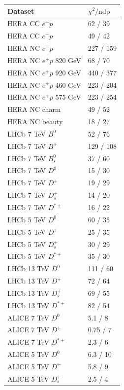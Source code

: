 \documentclass[12pt]{article}
\begin{document}
\begin{table}
\renewcommand*{\arraystretch}{1.12}
    \centering
\begin{tabular}{ll}
    Dataset & $\chi^2/\textrm{ndp}$ \\
    \hline
    HERA CC $e^{+}p$ & 62 / 39  \\ 
    HERA CC $e^{-}p$ & 49 / 42  \\ 
    HERA NC $e^{-}p$ & 227 / 159  \\ 
    HERA NC $e^{+}p$ 820 GeV & 68 / 70  \\ 
    HERA NC $e^{+}p$ 920 GeV & 440 / 377  \\ 
    HERA NC $e^{+}p$ 460 GeV & 223 / 204  \\ 
    HERA NC $e^{+}p$ 575 GeV & 223 / 254  \\ 
    HERA NC charm & 49 / 52  \\ 
    HERA NC beauty & 18 / 27  \\ 
    LHCb 7 TeV $B^0$ & 52 / 76  \\ 
    LHCb 7 TeV $B^{+}$ & 129 / 108  \\ 
    LHCb 7 TeV $B^{0}_s$ & 37 / 60  \\ 
    LHCb 7 TeV $D^0$ & 15 / 30  \\ 
    LHCb 7 TeV $D^{+}$ & 19 / 29  \\ 
    LHCb 7 TeV $D^{+}_{s}$ & 14 / 20  \\ 
    LHCb 7 TeV $D^{*+}$ & 16 / 22  \\ 
    LHCb 5 TeV $D^0$ & 60 / 35  \\ 
    LHCb 5 TeV $D^{+}$ & 25 / 35  \\ 
    LHCb 5 TeV $D^{+}_{s}$ & 30 / 29  \\ 
    LHCb 5 TeV $D^{*+}$ & 35 / 30  \\ 
    LHCb 13 TeV $D^0$ & 111 / 60  \\ 
    LHCb 13 TeV $D^{+}$ & 72 / 64  \\ 
    LHCb 13 TeV $D^{+}_{s}$ & 69 / 55  \\ 
    LHCb 13 TeV $D^{*+}$ & 82 / 54  \\ 
    ALICE 7 TeV $D^0$ & 5.1 / 8  \\ 
    ALICE 7 TeV $D^{+}$ & 0.75 / 7  \\ 
    ALICE 7 TeV $D^{*+}$ & 2.3 / 6  \\ 
    ALICE 5 TeV $D^0$ & 6.3 / 10  \\ 
    ALICE 5 TeV $D^{+}$ & 5.8 / 9  \\ 
    ALICE 5 TeV $D^{+}_{s}$ & 2.5 / 4  \\ 

\end{tabular}
\end{table}
\end{document}
